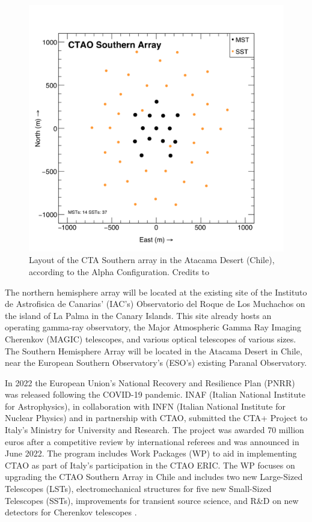 \begin{figure}[ht]
\centering
\includegraphics[width=0.8\linewidth]{figures/introduction/ctao-south.png}
\caption{Layout of the CTA Southern array in the Atacama Desert (Chile), according to the Alpha Configuration. Credits to \cite{zenodo_2021}}
\label{fig:ctao-south}
\end{figure}
The northern hemisphere array will be located at the existing site of the Instituto de Astrofisica de Canarias' (IAC's) Observatorio del Roque de Los Muchachos on the island of La Palma in the Canary Islands. This site already hosts an operating gamma-ray observatory, the Major Atmospheric Gamma Ray Imaging Cherenkov (MAGIC) telescopes, and various optical telescopes of various sizes. The Southern Hemisphere Array will be located in the Atacama Desert in Chile, near the European Southern Observatory's (ESO's) existing Paranal Observatory. 

In 2022 the European Union's National Recovery and Resilience Plan (PNRR) was released following the COVID-19 pandemic. INAF (Italian National Institute for Astrophysics), in collaboration with INFN (Italian National Institute for Nuclear Physics) and in partnership with CTAO, submitted the CTA+ Project to Italy's Ministry for University and Research. The project was awarded 70 million euros after a competitive review by international referees and was announced in June 2022.
The program includes Work Packages (WP) to aid in implementing CTAO as part of Italy's participation in the CTAO ERIC. The WP focuses on upgrading the CTAO Southern Array in Chile and includes two new Large-Sized Telescopes (LSTs), electromechanical structures for five new Small-Sized Telescopes (SSTs), improvements for transient source science, and R\&D on new detectors for Cherenkov telescopes \cite{ctaobservatorywebsite}.

